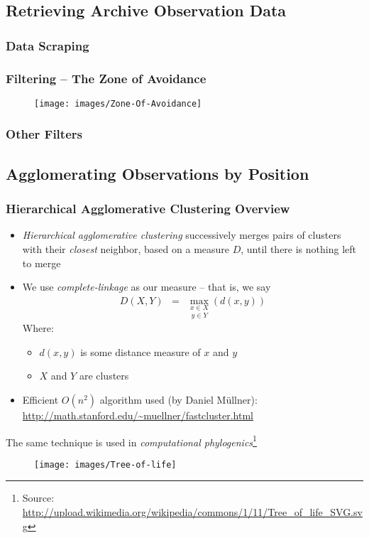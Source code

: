 \subsection{Retrieving Archive Observation Data}
\begin{frame}
\frametitle{Data Scraping}
\end{frame}
\begin{frame}
\frametitle{Filtering -- The Zone of Avoidance}
\begin{figure}[h,b]
\centering
\texttt{[image: images/Zone-Of-Avoidance]}
\end{figure}
\end{frame}
\begin{frame}
\frametitle{Other Filters}
\end{frame}
\subsection{Agglomerating Observations by Position}
\begin{frame}[allowframebreaks]
\frametitle{Hierarchical Agglomerative Clustering Overview}
\begin{itemize}
	\item \emph{Hierarchical agglomerative clustering} successively merges pairs of clusters with their \emph{closest} neighbor, based on a measure $D$, until there is nothing left to merge
	\item We use \emph{complete-linkage} as our measure -- that is, we say
\begin{eqnarray*}
  D (X, Y) & = & \underset{y \in Y}{\underset{x \in X}{\max}} (d (x, y))
\end{eqnarray*}
	Where:
	\begin{itemize}
		\item $d(x,y)$ is some distance measure of $x$ and $y$
		\item $X$ and $Y$ are clusters
	\end{itemize}
	\item Efficient $O(n^2)$ algorithm used (by Daniel M\"{u}llner):\\
	{\small \url{http://math.stanford.edu/~muellner/fastcluster.html}}
\end{itemize}
\framebreak
	The same technique is used in \emph{computational phylogenics}\footnote{Source: \url{http://upload.wikimedia.org/wikipedia/commons/1/11/Tree_of_life_SVG.svg}}
\begin{figure}[h,b]
\centering
\texttt{[image: images/Tree-of-life]}
\end{figure}
\end{frame}
	
